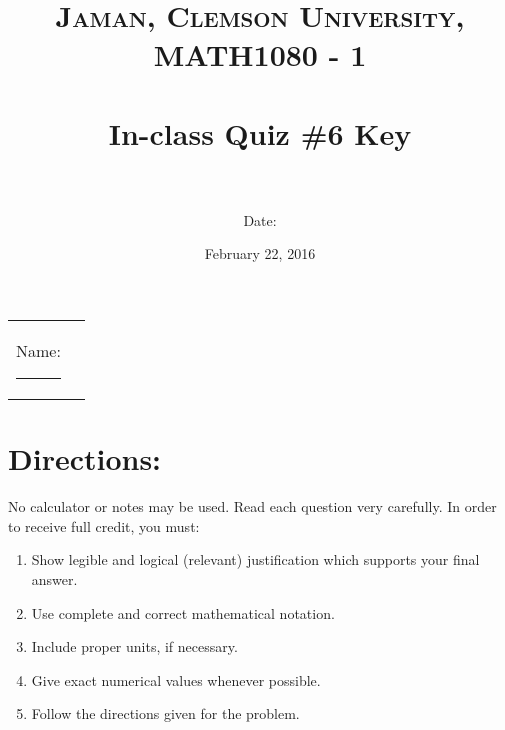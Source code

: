 \documentclass[paper=a4, fontsize=11pt]{scrartcl} %
\title{	
\normalfont \normalsize 
\textsc{Jaman, Clemson University, MATH1080 - 1} \\ [25pt] %
\horrule{0.5pt} \\[0.4cm] %
\huge In-class Quiz \#6 Key \\ %
\horrule{2pt} \\[0.5cm] %
}
\author{Date:} %
\date{\normalsize February 22, 2016} %
\numberwithin{equation}{section} %
\numberwithin{figure}{section} %
\numberwithin{table}{section} %
\begin{document}
\maketitle %

\begin{flushleft}
\begin{tabular}{l l}
Name: \rule{3.2in}{.01cm}  & {}%
\end{tabular}
\end{flushleft}


\section*{\textbf{Directions:}}

No calculator or notes may be used.  Read each question very carefully.  In order to receive full credit, you must:
\begin{enumerate}
\item Show legible and logical (relevant) justification which supports your final answer.
\item Use complete and correct mathematical notation.
\item Include proper units, if necessary.
\item Give exact numerical values whenever possible.
\item Follow the directions given for the problem.
\end{enumerate}
\vspace{.1in}

\newpage
\end{document}
